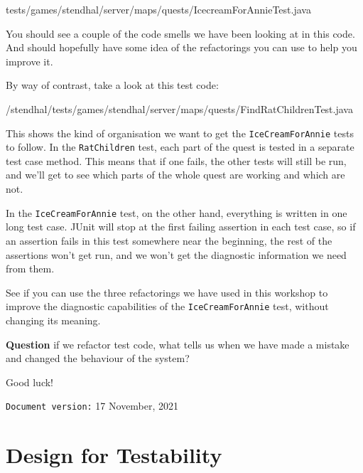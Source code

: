 \documentclass[
]{book}
\newenvironment{Shaded}{\begin{snugshade}}{\end{snugshade}}
\newcommand{\FunctionTok}[1]{\textcolor[rgb]{0.00,0.00,0.00}{#1}}
\newcommand{\NormalTok}[1]{#1}
\begin{document}
\begin{Shaded}
\begin{Highlighting}[]
\NormalTok{tests/games/stendhal/server/maps/quests/IcecreamForAnnieTest.}\FunctionTok{java}
\end{Highlighting}
\end{Shaded}

You should see a couple of the code smells we have been looking at in this code. And should hopefully have some idea of the refactorings you can use to help you improve it.

By way of contrast, take a look at this test code:

\begin{Shaded}
\begin{Highlighting}[]
\NormalTok{/stendhal/tests/games/stendhal/server/maps/quests/FindRatChildrenTest.}\FunctionTok{java}
\end{Highlighting}
\end{Shaded}

This shows the kind of organisation we want to get the \texttt{IceCreamForAnnie} tests to follow. In the \texttt{RatChildren} test, each part of the quest is tested in a separate test case method. This means that if one fails, the other tests will still be run, and we'll get to see which parts of the whole quest are working and which are not.

In the \texttt{IceCreamForAnnie} test, on the other hand, everything is written in one long test case. JUnit will stop at the first failing assertion in each test case, so if an assertion fails in this test somewhere near the beginning, the rest of the assertions won't get run, and we won't get the diagnostic information we need from them.

See if you can use the three refactorings we have used in this workshop to improve the diagnostic capabilities of the \texttt{IceCreamForAnnie} test, without changing its meaning.

\textbf{Question} if we refactor test code, what tells us when we have made a mistake and changed the behaviour of the system?

Good luck!

\texttt{Document\ version:} 17 November, 2021

\hypertarget{designing}{%
\chapter{Design for Testability}\label{designing}}
\end{document}
